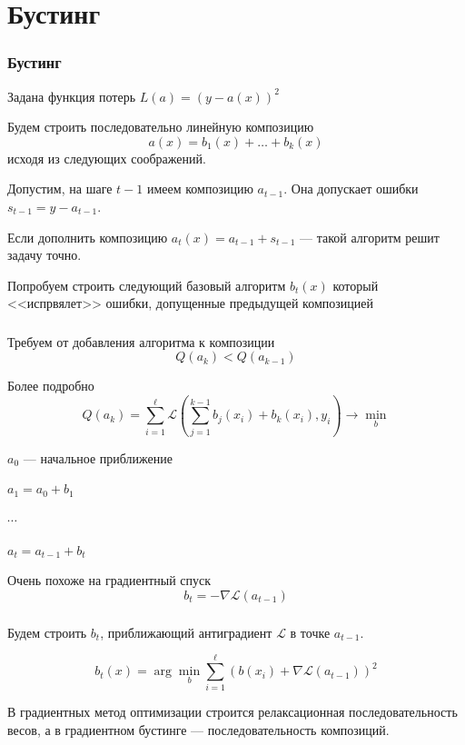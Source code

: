 \documentclass{beamer}
\begin{document}
	\section{Бустинг}

	\begin{frame}
		\frametitle{Бустинг}
		Задана функция потерь $L(a) = (y - a(x))^2$

		Будем строить последовательно линейную композицию
		\[
		a(x) = b_1(x) + \dots + b_k(x)
		\]
		исходя из следующих соображений.
		
		Допустим, на шаге $t-1$  имеем композицию $a_{t - 1}$. Она допускает ошибки
		$s_{t-1} = y - a_{t-1}$.

		Если дополнить композицию $a_t(x) = a_{t - 1} + s_{t-1}$ --- такой алгоритм решит задачу точно.

		Попробуем строить следующий базовый алгоритм $b_t(x)$ который <<испрвялет>> ошибки, допущенные 
		предыдущей композицией
	\end{frame}

	\begin{frame}
		\frametitle{}
		 
		Требуем от добавления алгоритма к композиции
		\[
		Q(a_k) < Q(a_{k-1})
		\]

		Более подробно
		\[
		Q(a_k) = \sum_{i=1}^{\ell} \mathcal{L} \left( \sum_{j=1}^{k - 1} b_j(x_i) + b_k(x_i), y_i \right) \rightarrow \min_{b}
		\]

		\begin{center}
			$a_0$ --- начальное приближение
	
			$a_1 = a_0 + b_1$ 
			
			$\cdots$

			$a_t = a_{t-1} + b_t$ 
		\end{center}
		Очень похоже на градиентный спуск
		\[
		b_t = - \nabla \mathcal{L}  (a_{t-1})
		\]

	\end{frame}

	\begin{frame}
		\frametitle{}
		Будем строить $b_t$, приближающий антиградиент $\mathcal{L}$ в точке $a_{t-1}$.

		\[
		b_t(x) = \arg \min_{b} \sum_{i=1}^{\ell} (b(x_i) + \nabla \mathcal{L}  (a_{t-1}))^2
		\]

		В градиентных метод оптимизации строится релаксационная последовательность весов, а в градиентном бустинге ---
		последовательность композиций.

	\end{frame}
\end{document}

